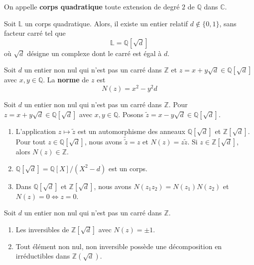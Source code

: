  \begin{definition}
    On appelle \textbf{corps quadratique} toute extension de degré $2$ de $\mathbb{Q}$ dans $\mathbb{C}$.
  \end{definition}

  \begin{theorem}
    Soit $\mathbb{L}$ un corps quadratique. Alors, il existe un entier relatif $d \notin \{ 0, 1 \}$, sans facteur carré tel que
    \[ \mathbb{L} = \mathbb{Q}[\sqrt{d}] \]
    où $\sqrt{d}$ désigne un complexe dont le carré est égal à $d$.
  \end{theorem}


  \begin{definition}
    Soit $d$ un entier non nul qui n'est pas un carré dans $\mathbb{Z}$ et $z = x+y\sqrt{d} \in \mathbb{Q}[\sqrt{d}]$ avec $x, y \in \mathbb{Q}$. La \textbf{norme} de $z$ est
    \[ N(z) = x^2-y^2d \]
  \end{definition}

  \begin{proposition}
    Soit $d$ un entier non nul qui n'est pas un carré dans $\mathbb{Z}$. Pour $z = x+y\sqrt{d} \in \mathbb{Q}[\sqrt{d}]$ avec $x,y \in \mathbb{Q}$. Posons $\widetilde{z} = x-y\sqrt{d} \in \mathbb{Q}[\sqrt{d}]$.
    \begin{enumerate}[label=(\roman*)]
      \item L'application $z \mapsto \widetilde{z}$ est un automorphisme des anneaux $\mathbb{Q}[\sqrt{d}]$ et $\mathbb{Z}[\sqrt{d}]$. Pour tout $z \in \mathbb{Q}[\sqrt{d}]$, nous avons $\widetilde{\widetilde{z}} = z$ et $N(z) = z \widetilde{z}$. Si $z \in \mathbb{Z}[\sqrt{d}]$, alors $N(z) \in \mathbb{Z}$.
      \item $\mathbb{Q}[\sqrt{d}] = \mathbb{Q}[X]/(X^2 - d)$ est un corps.
      \item Dans $\mathbb{Q}[\sqrt{d}]$ et $\mathbb{Z}[\sqrt{d}]$, nous avons $N(z_1 z_2) = N(z_1) N(z_2)$ et $N(z) = 0 \iff z = 0$.
    \end{enumerate}
  \end{proposition}

  \begin{proposition}
    Soit $d$ un entier non nul qui n'est pas un carré dans $\mathbb{Z}$.
    \begin{enumerate}[label=(\roman*)]
      \item Les inversibles de $\mathbb{Z}[\sqrt{d}]$ avec $N(z) = \pm 1$.
      \item Tout élément non nul, non inversible possède une décomposition en irréductibles dans $\mathbb{Z}(\sqrt{d})$.
    \end{enumerate}
  \end{proposition}

